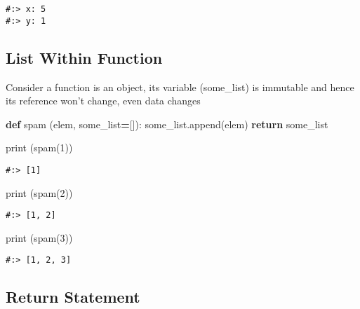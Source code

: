 \documentclass[
]{book}
\newenvironment{Shaded}{\begin{snugshade}}{\end{snugshade}}
\newcommand{\BuiltInTok}[1]{#1}
\newcommand{\ControlFlowTok}[1]{\textcolor[rgb]{0.27,0.27,0.27}{\textbf{#1}}}
\newcommand{\DecValTok}[1]{\textcolor[rgb]{0.06,0.06,0.06}{#1}}
\newcommand{\KeywordTok}[1]{\textcolor[rgb]{0.27,0.27,0.27}{\textbf{#1}}}
\newcommand{\NormalTok}[1]{#1}
\newcommand{\OperatorTok}[1]{\textcolor[rgb]{0.43,0.43,0.43}{\textbf{#1}}}
\begin{document}
\begin{verbatim}
#:> x: 5
#:> y: 1
\end{verbatim}

\hypertarget{list-within-function}{%
\subsection{List Within Function}\label{list-within-function}}

Consider a function is an object, its variable (some\_list) is immutable and hence its reference won't change, even data changes

\begin{Shaded}
\begin{Highlighting}[]
\KeywordTok{def}\NormalTok{ spam (elem, some\_list}\OperatorTok{=}\NormalTok{[]):}
\NormalTok{    some\_list.append(elem)}
    \ControlFlowTok{return}\NormalTok{ some\_list}

\BuiltInTok{print}\NormalTok{ (spam(}\DecValTok{1}\NormalTok{))}
\end{Highlighting}
\end{Shaded}

\begin{verbatim}
#:> [1]
\end{verbatim}

\begin{Shaded}
\begin{Highlighting}[]
\BuiltInTok{print}\NormalTok{ (spam(}\DecValTok{2}\NormalTok{))}
\end{Highlighting}
\end{Shaded}

\begin{verbatim}
#:> [1, 2]
\end{verbatim}

\begin{Shaded}
\begin{Highlighting}[]
\BuiltInTok{print}\NormalTok{ (spam(}\DecValTok{3}\NormalTok{))}
\end{Highlighting}
\end{Shaded}

\begin{verbatim}
#:> [1, 2, 3]
\end{verbatim}

\hypertarget{return-statement}{%
\subsection{Return Statement}\label{return-statement}}
\end{document}
